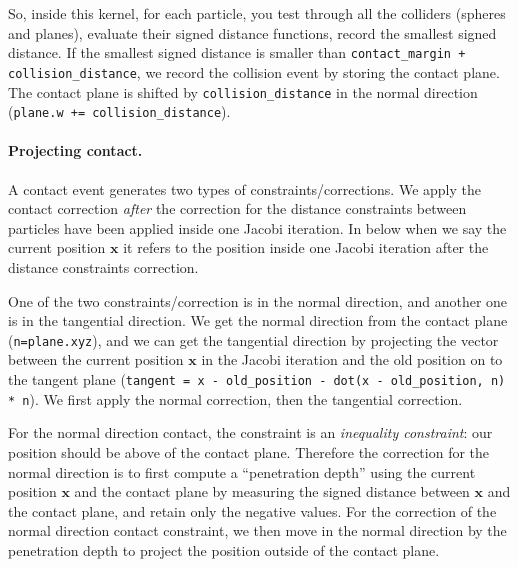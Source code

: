 So, inside this kernel, for each particle, you test through all the colliders (spheres and planes), evaluate their signed distance functions, record the smallest signed distance. If the smallest signed distance is smaller than \lstinline{contact_margin + collision_distance}, we record the collision event by storing the contact plane. The contact plane is shifted by \lstinline{collision_distance} in the normal direction (\lstinline{plane.w += collision_distance}).

\paragraph{Projecting contact.}
A contact event generates two types of constraints/corrections. We apply the contact correction \emph{after} the correction for the distance constraints between particles have been applied inside one Jacobi iteration. In below when we say the current position $\mathbf{x}$ it refers to the position inside one Jacobi iteration after the distance constraints correction.

One of the two constraints/correction is in the normal direction, and another one is in the tangential direction. We get the normal direction from the contact plane (\lstinline{n=plane.xyz}), and we can get the tangential direction by projecting the vector between the current position $\mathbf{x}$ in the Jacobi iteration and the old position on to the tangent plane (\lstinline{tangent = x - old_position - dot(x - old_position, n) * n}). We first apply the normal correction, then the tangential correction.

For the normal direction contact, the constraint is an \emph{inequality constraint}: our position should be above of the contact plane. Therefore the correction for the normal direction is to first compute a ``penetration depth'' using the current position $\mathbf{x}$ and the contact plane by measuring the signed distance between $\mathbf{x}$ and the contact plane, and retain only the negative values. For the correction of the normal direction contact constraint, we then move in the normal direction by the penetration depth to project the position outside of the contact plane.

